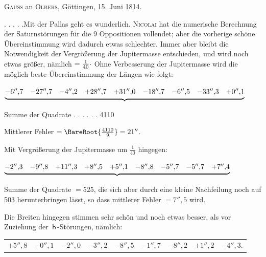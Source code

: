 \par{}\bigskip
\begin{center}
\textsc{Gauss} an \textsc{Olbers}, Göttingen, 15. Juni 1814.
\end{center}
\noindent\hspace*{\parindent}. . . . .\quad Mit der Pallas geht es wunderlich. \textsc{Nicolai} hat die numerische Berechnung der Saturnstörungen für die 9 Oppositionen vollendet; aber die vorherige schöne Übereinstimmung wird dadurch etwas schlechter. Immer aber bleibt die Notwendigkeit der Vergrößerung der Jupitermasse entschieden, und wird noch etwas größer, nämlich \(=\frac{1}{40}\mathpunct{\raisebox{.3ex}{.}}\) Ohne Verbesserung der Jupitermasse wird die möglich beste Übereinstimmung der Längen wie folgt:
\begin{center}
\begingroup\small\setlength{\arraycolsep}{3pt}
\(\underbrace{\begin{array}{@{}rrrrrrrrr@{}}
-6''{,}7&-27''{,}7&-4''{,}2&+28''{,}7&+31''{,}0&-18''{,}7&-6''{,}5&-33''{,}3&+0''{,}1
\end{array}}\)\par
Summe der Quadrate . . . . . . 4110\par\smallskip
Mittlerer Fehler \(=\BareRoot{\frac{4110}{9}}=21''\).
\endgroup
\end{center}
\par Mit Vergrößerung der Jupitermasse um \(\frac{1}{40}\) hingegen:
\begin{center}
\begingroup\small\setlength{\arraycolsep}{3pt}
\(\underbrace{\begin{array}{@{}rrrrrrrrr@{}}
-2''{,}3&-9''{,}8&+11''{,}3&+8''{,}5&+5''{,}1&-8''{,}8&-5''{,}7&-5''{,}7&+7''{,}4
\end{array}}\)\par
Summe der Quadrate \(=525\), die sich aber durch eine kleine Nachfeilung noch auf 503 herunterbringen lässt, so dass mittlerer Fehler \(=7''{,}5\) wird.
\endgroup
\end{center}
\par{}
Die Breiten hingegen stimmen sehr schön und noch etwas besser, als vor Zuziehung der {\AstroSymbols ♄}-Störungen, nämlich:
\begin{center}
\begingroup\small\setlength{\tabcolsep}{3pt}
\begin{tabular}{@{}rrrrrrrrr@{}}
\(+5''{,}8\)&\(-0''{,}1\)&\(-2''{,}0\)&\(-3''{,}2\)&\(-8''{,}5\)\footnotemark&\(-1''{,}7\)&\(-8''{,}2\)&\(+1''{,}2\)&\(-4''{,}3\).
\end{tabular}
\endgroup
\end{center}
